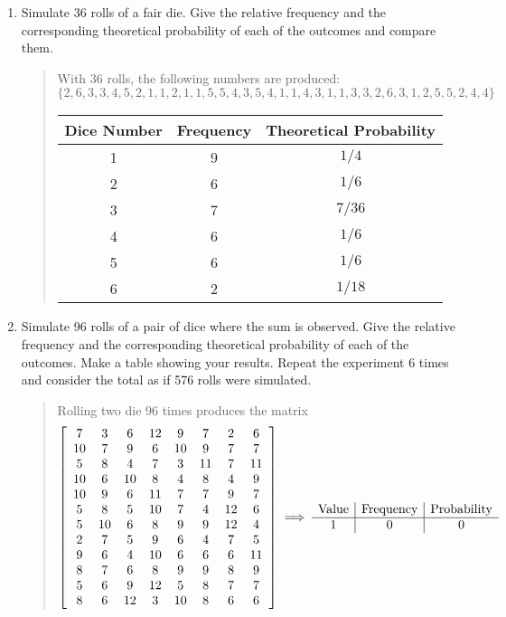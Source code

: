 \documentclass{hw}
\begin{document}
\begin{enumerate}
\item Simulate 36 rolls of a fair die. Give the relative frequency and the corresponding theoretical
probability of each of the outcomes and compare them.
\begin{quote}
With 36 rolls, the following numbers are produced:\\
\[\{2,6,3,3,4,5,2,1,1,2,1,1,5,5,4,3,5,4,1,1,4,3,1,1,3,3,2,6,3,1,2,5,5,2,4,4\}\]
\begin{center}
\begin{tabular}{c | c | c}
Dice Number & Frequency & Theoretical Probability\\
\hline
1 & 9 & ${1/4}$\\

2 & 6 & ${1/6}$\\

3 & 7 & ${7/36}$\\

4 & 6 & ${1/6}$\\

5 & 6 & ${1/6}$\\

6 & 2 & ${1/18}$\\
\end{tabular}
\end{center}
\end{quote}

\item Simulate 96 rolls of a pair of dice where the sum is observed. Give the relative frequency and the
corresponding theoretical probability of each of the outcomes. Make a table showing your results. Repeat
the experiment 6 times and consider the total as if 576 rolls were simulated.
\begin{quote}
Rolling two die 96 times produces the matrix
\[
\left[
\begin{array}{c c c c c c c c}
7 & 3 & 6 & 12 & 9 & 7 & 2 & 6\\
10 & 7 & 9 & 6 & 10 & 9 & 7 & 7\\
5 & 8 & 4 & 7 & 3 & 11 & 7 & 11\\
10 & 6 & 10 & 8 & 4 & 8 & 4 & 9\\
10 & 9 & 6 & 11 & 7 & 7 & 9 & 7\\
5 & 8 & 5 & 10 & 7 & 4 & 12 & 6\\
5 & 10 & 6 & 8 & 9 & 9 & 12 & 4\\
2 & 7 & 5 & 9 & 6 & 4 & 7 & 5\\
9 & 6 & 4 & 10 & 6 & 6 & 6 & 11\\
8 & 7 & 6 & 8 & 9 & 9 & 8 & 9\\
5 & 6 & 9 & 12 & 5 & 8 & 7 & 7\\
8 & 6 & 12 & 3 & 10 & 8 & 6 & 6
\end{array}
\right]
\implies
\begin{array}{c | c | c}
\text{Value} & \text{Frequency} & \text{Probability}\\
\hline
1 & 0 & 0\\


\end{array}\]
\end{quote}
\end{enumerate}
\end{document}
